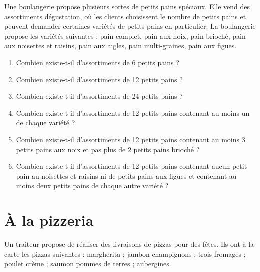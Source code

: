 \documentclass[a4paper,11pt]{article}
\begin{document}
Une boulangerie propose plusieurs sortes de petits pains spéciaux. Elle vend des assortiments dégustation, où les clients choisissent le nombre de petits pains et peuvent demander certaines variétés de petits pains en particulier. La boulangerie propose les variétés suivantes : pain complet, pain aux noix, pain brioché, pain aux noisettes et raisins, pain aux aigles, pain multi-graines, pain aux figues.

\begin{enumerate}
\item Combien existe-t-il d'assortiments de 6 petits pains ?

\item Combien existe-t-il d'assortiments de 12 petits pains ?

\item Combien existe-t-il d'assortiments de 24 petits pains ?

\item Combien existe-t-il d'assortiments de 12 petits pains contenant au moins un de chaque variété ?

\item Combien existe-t-il d'assortiments de 12 petits pains contenant au moins 3 petits pains aux noix et pas plus de 2 petits pains brioché ?

\item Combien existe-t-il d'assortiments de 12 petits pains contenant aucun petit pain au noisettes et raisins ni de petits pains aux figues et contenant au moins deux petits pains de chaque autre variété ?
\end{enumerate}

\section{À la pizzeria}

Un traiteur propose de réaliser des livraisons de pizzas pour des fêtes. Ils ont à la carte les pizzas suivantes : margherita ; jambon champignons ; trois fromages ; poulet crème ; saumon pommes de terres ; aubergines.
\end{document}
